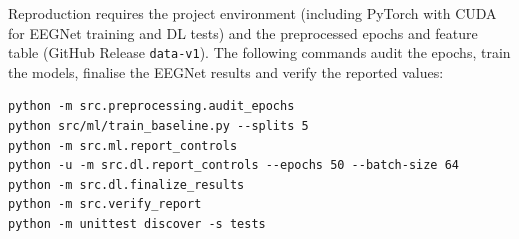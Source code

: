 \documentclass[11pt,a4paper]{article}
\newcommand{\code}[1]{\nolinkurl{#1}}
\begin{document}
\noindent\begin{minipage}{\linewidth}
\noindent Reproduction requires the project environment (including PyTorch with CUDA for EEGNet training and DL tests) and the preprocessed epochs and feature table (GitHub Release \code{data-v1}). The following commands audit the epochs, train the models, finalise the EEGNet results and verify the reported values:
{\small\begin{verbatim}
python -m src.preprocessing.audit_epochs
python src/ml/train_baseline.py --splits 5
python -m src.ml.report_controls
python -u -m src.dl.report_controls --epochs 50 --batch-size 64
python -m src.dl.finalize_results
python -m src.verify_report
python -m unittest discover -s tests
\end{verbatim}}
\end{minipage}
\end{document}
